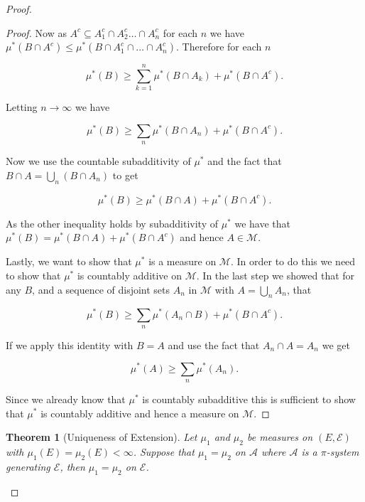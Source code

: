 \documentclass[
]{book}
\newtheorem{theorem}{Theorem}[chapter]
\theoremstyle{definition}
\theoremstyle{definition}
\theoremstyle{definition}
\theoremstyle{definition}
\theoremstyle{remark}
\begin{document}
\begin{proof}
\begin{proof}
Now as \(A^c \subseteq A_1^c \cap A_2^c \dots \cap A_n^c\) for each \(n\) we have \(\mu^*(B \cap A^c) \leq \mu^*(B \cap A_1^c \cap \dots \cap A_n^c)\). Therefore for each \(n\)

\[ \mu^*(B) \geq \sum_{k=1}^n \mu^*(B \cap A_k) + \mu^*(B \cap A^c). \]

Letting \(n \rightarrow \infty\) we have

\[ \mu^*(B) \geq \sum_n \mu^*(B \cap A_n) + \mu^*(B \cap A^c). \]

Now we use the countable subadditivity of \(\mu^*\) and the fact that \(B \cap A = \bigcup_n (B \cap A_n)\) to get

\[ \mu^*(B) \geq \mu^*(B \cap A) + \mu^*(B \cap A^c). \]

As the other inequality holds by subadditivity of \(\mu^*\) we have that \(\mu^*(B) = \mu^*(B \cap A) + \mu^*(B \cap A^c)\) and hence \(A \in \mathscr{M}\).

Lastly, we want to show that \(\mu^*\) is a measure on \(\mathscr{M}\). In order to do this we need to show that \(\mu^*\) is countably additive on \(\mathscr{M}\). In the last step we showed that for any \(B\), and a sequence of disjoint sets \(A_n\) in \(\mathscr{M}\) with \(A= \bigcup_n A_n\), that

\[ \mu^*(B) \geq \sum_n \mu^*(A_n \cap B) + \mu^*(B \cap A^c). \]

If we apply this identity with \(B=A\) and use the fact that \(A_n \cap A = A_n\) we get

\[ \mu^*(A) \geq \sum_n \mu^*(A_n). \]

Since we already know that \(\mu^*\) is countably subadditive this is sufficient to show that \(\mu^*\) is countably additive and hence a measure on \(\mathscr{M}\).
\end{proof}

\begin{theorem}[Uniqueness of Extension]
Let \(\mu_1\) and \(\mu_2\) be measures on \((E,\mathcal{E})\) with \(\mu_1(E) = \mu_2(E) < \infty\). Suppose that \(\mu_1 = \mu_2\) on \(\mathcal{A}\) where \(\mathcal{A}\) is a \(\pi\)-system generating \(\mathcal{E}\), then \(\mu_1 = \mu_2\) on \(\mathcal{E}\).
\end{theorem}


\end{proof}
\end{document}
